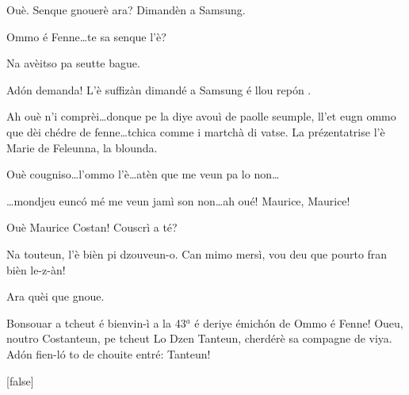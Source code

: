 \begin{drama}
\Vioupspeaks Ouè. Senque gnouerè ara? Dimandèn a Samsung.


\Vioupspeaks \og Ommo é Fenne\fg\ldots te sa senque l'è?

\Vioujspeaks{} Na avèitso pa seutte bague.

\Vioupspeaks Ad\'on demanda! L'è suffizàn dimandé a Samsung é llou rep\'on .


\Vioupspeaks Ah ouè n'i comprèi\ldots donque pe la diye avouì de paolle seumple, ll'et eugn ommo que dèi chédre de fenne\ldots tchica comme i martchà di vatse. La prézentatrise l'è Marie de Feleunna, la blounda.

\Vioujspeaks Ouè cougniso\ldots l'ommo l'è\ldots atèn que me veun pa lo non\ldots

\Vioupspeaks \ldots mondjeu eunc\'o mé me veun jamì son non\ldots ah oué! Maurice, Maurice!

\Vioujspeaks Ouè Maurice Costan! Couscrì a té?

\Vioupspeaks Na touteun, l'è bièn pi dzouveun-o. Can mimo mersì, vou deu que pourto fran bièn le-z-àn!

\Vioujspeaks Ara quèi que gnoue.








\Mariespeaks Bonsouar a tcheut é bienvin-ì a la 43$^a$ é deriye émich\'on de \og Ommo é Fenne\fg! Oueu, noutro Costanteun, pe tcheut \og Lo Dzen Tanteun\fg, cherdérè sa compagne de viya. Ad\'on fien-l\'o to de chouite entré: Tanteun!

[false]%


\end{drama}
